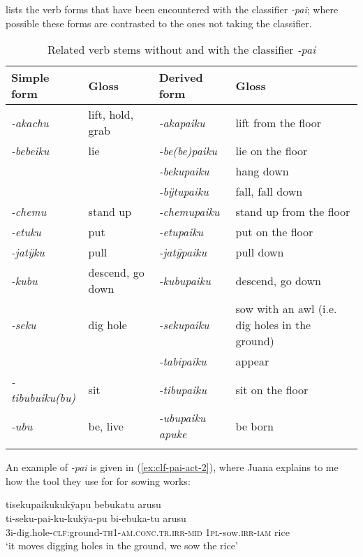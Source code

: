  lists the verb forms that have been encountered with the classifier \textit{-pai}; where possible these forms are contrasted to the ones not taking the classifier.

\begin{table}[t]
\caption{Related verb stems without and with the classifier \textit{-pai}}

\begin{tabularx}{\textwidth}{lllQ}
\lsptoprule
Simple form & Gloss & Derived form & Gloss \\
\midrule
\textit{-akachu} & lift, hold, grab & \textit{-akapaiku} & lift from the floor\\
\textit{-bebeiku} & lie & \textit{-be(be)paiku} & lie on the floor\\
 &  & \textit{-bekupaiku} & hang down\\
 &  & \textit{-bÿtupaiku} & fall, fall down\\
\textit{-chemu} & stand up & \textit{-chemupaiku} & stand up from the floor\\
\textit{-etuku} & put & \textit{-etupaiku} & put on the floor\\
\textit{-jatÿku} & pull & \textit{-jatÿpaiku} & pull down\\
\textit{-kubu} & descend, go down & \textit{-kubupaiku} & descend, go down\\
\textit{-seku} & dig hole & \textit{-sekupaiku} & sow with an awl (i.e. dig holes in the ground)\\
& & \textit{-tabipaiku} & appear\\
\textit{-tibubuiku(bu)} & sit & \textit{-tibupaiku} & sit on the floor\\
\textit{-ubu} & be, live & \textit{-ubupaiku apuke} & be born\\
\lspbottomrule
\end{tabularx}

\label{table:DIR-pai-deriv}
\end{table}


An example of \textit{-pai} is given in (\ref{ex:clf-pai-act-2}), where Juana explains to me how the tool they use for for sowing works:

\ea\label{ex:clf-pai-act-2}
\begingl
\glpreamble tisekupaikukukÿapu bebukatu arusu\\
\gla ti-seku-pai-ku-kukÿa-pu bi-ebuka-tu arusu\\
\glb 3i-dig.hole-\textsc{clf:}ground-\textsc{th}1-\textsc{am.conc.tr.irr}-\textsc{mid} 1\textsc{pl}-sow.\textsc{irr}-\textsc{iam} rice\\
\glft ‘it moves digging holes in the ground, we sow the rice’
\endgl
\trailingcitation{[jxx-p120515l-2.042]}
\xe

